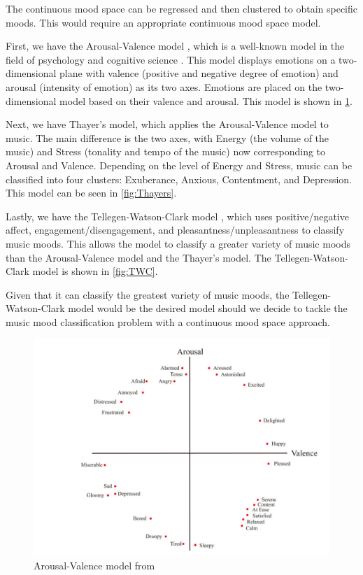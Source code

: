 The continuous mood space can be regressed and then clustered to obtain specific moods. This would require an appropriate continuous mood space model.

First, we have the Arousal-Valence model \cite{circumplex}, which is a well-known model in the field of psychology and cognitive science \cite{circumplexbook} \cite{circumplex3}. This model displays emotions on a two-dimensional plane with valence (positive and negative degree of emotion) and arousal (intensity of emotion) as its two axes. Emotions are placed on the two-dimensional model based on their valence and arousal. This model is shown in \cref{fig:circumplex}.

Next, we have Thayer's model, which applies the Arousal-Valence model to music. The main difference is the two axes, with Energy (the volume of the music) and Stress (tonality and tempo of the music) now corresponding to Arousal and Valence. Depending on the level of Energy and Stress, music can be classified into four clusters: Exuberance, Anxious, Contentment, and Depression. This model can be seen in \cref{fig:Thayers}.

Lastly, we have the Tellegen-Watson-Clark model \cite{Watson1985} \cite{Tellegen1999}, which uses positive/negative affect, engagement/disengagement, and pleasantness/unpleasantness to classify music moods. This allows the model to classify a greater variety of music moods than the Arousal-Valence model and the Thayer's model. The Tellegen-Watson-Clark model is shown in \cref{fig:TWC}.

Given that it can classify the greatest variety of music moods, the Tellegen-Watson-Clark model would be the desired model should we decide to tackle the music mood classification problem with a continuous mood space approach. 

\begin{figure}
    \centering
    \includegraphics[scale=0.4]{Figures/Arousal-Valence model}
    \decoRule
    \caption{Arousal-Valence model from \cite{MoodIoT}}
    \label{fig:circumplex}
    \end{figure}


